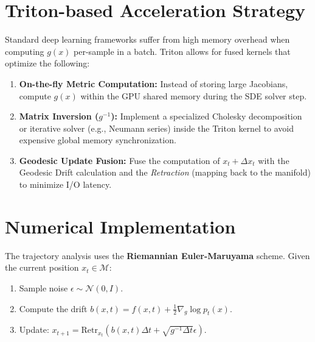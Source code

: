 \documentclass{article}
\begin{document}
\section{Triton-based Acceleration Strategy}
Standard deep learning frameworks suffer from high memory overhead when computing $g(x)$ per-sample in a batch. Triton allows for fused kernels that optimize the following:

\begin{enumerate}
    \item \textbf{On-the-fly Metric Computation:} Instead of storing large Jacobians, compute $g(x)$ within the GPU shared memory during the SDE solver step.
    \item \textbf{Matrix Inversion ($g^{-1}$):} Implement a specialized Cholesky decomposition or iterative solver (e.g., Neumann series) inside the Triton kernel to avoid expensive global memory synchronization.
    \item \textbf{Geodesic Update Fusion:} Fuse the computation of $x_{t} + \Delta x_t$ with the Geodesic Drift calculation and the \textit{Retraction} (mapping back to the manifold) to minimize I/O latency.
\end{enumerate}

\section{Numerical Implementation}
The trajectory analysis uses the \textbf{Riemannian Euler-Maruyama} scheme. Given the current position $x_t \in \mathcal{M}$:
\begin{enumerate}
    \item Sample noise $\epsilon \sim \mathcal{N}(0, I)$.
    \item Compute the drift $b(x, t) = f(x, t) + \frac{1}{2} \nabla_g \log p_t(x)$.
    \item Update: $x_{t+1} = \text{Retr}_{x_t} \left( b(x, t)\Delta t + \sqrt{g^{-1} \Delta t} \epsilon \right)$.
\end{enumerate}
\end{document}
